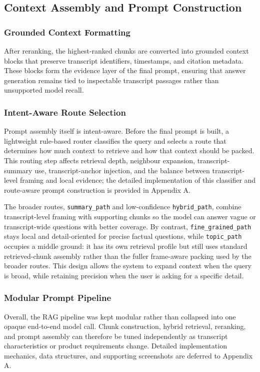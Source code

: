 \subsection{Context Assembly and Prompt Construction}
\subsubsection{Grounded Context Formatting}
After reranking, the highest-ranked chunks are converted into grounded context blocks that preserve transcript identifiers, timestamps, and citation metadata. These blocks form the evidence layer of the final prompt, ensuring that answer generation remains tied to inspectable transcript passages rather than unsupported model recall.\cite{langchain_prompts,langchain_chatprompt,langchain_messages_placeholder}

\subsubsection{Intent-Aware Route Selection}
Prompt assembly itself is intent-aware. Before the final prompt is built, a lightweight rule-based router classifies the query and selects a route that determines how much context to retrieve and how that context should be packed. This routing step affects retrieval depth, neighbour expansion, transcript-summary use, transcript-anchor injection, and the balance between transcript-level framing and local evidence; the detailed implementation of this classifier and route-aware prompt construction is provided in Appendix A.

The broader routes, \texttt{summary\_path} and low-confidence \texttt{hybrid\_path}, combine transcript-level framing with supporting chunks so the model can answer vague or transcript-wide questions with better coverage. By contrast, \texttt{fine\_grained\_path} stays local and detail-oriented for precise factual questions, while \texttt{topic\_path} occupies a middle ground: it has its own retrieval profile but still uses standard retrieved-chunk assembly rather than the fuller frame-aware packing used by the broader routes. This design allows the system to expand context when the query is broad, while retaining precision when the user is asking for a specific detail.

\subsubsection{Modular Prompt Pipeline}
Overall, the RAG pipeline was kept modular rather than collapsed into one opaque end-to-end model call. Chunk construction, hybrid retrieval, reranking, and prompt assembly can therefore be tuned independently as transcript characteristics or product requirements change. Detailed implementation mechanics, data structures, and supporting screenshots are deferred to Appendix A.

